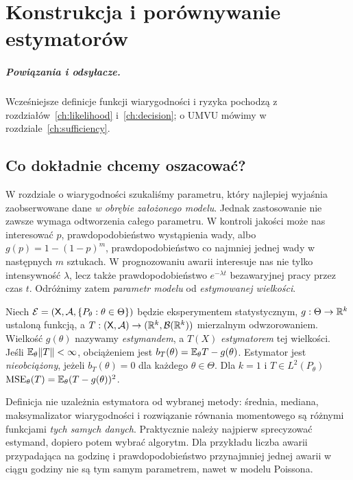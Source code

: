\chapter{Konstrukcja i porównywanie estymatorów}
\label{ch:estimators}
\paragraph{Powiązania i odsyłacze.} Wcześniejsze definicje funkcji wiarygodności i ryzyka pochodzą z rozdziałów~\ref{ch:likelihood} i~\ref{ch:decision}; o UMVU mówimy w rozdziale~\ref{ch:sufficiency}.


\section{Co dokładnie chcemy oszacować?}
W rozdziale o wiarygodności szukaliśmy parametru, który najlepiej
wyjaśnia zaobserwowane dane \emph{w obrębie założonego modelu}.
Jednak zastosowanie nie zawsze wymaga odtworzenia całego parametru.
W kontroli jakości może nas interesować $p$, prawdopodobieństwo
wystąpienia wady, albo $g(p)=1-(1-p)^m$, prawdopodobieństwo
co najmniej jednej wady w następnych $m$ sztukach. W prognozowaniu
awarii interesuje nas nie tylko intensywność $\lambda$, lecz także
prawdopodobieństwo $e^{-\lambda t}$ bezawaryjnej pracy przez czas $t$.
Odróżnimy zatem \emph{parametr modelu} od \emph{estymowanej wielkości}.

\begin{definicja}\label{def:estimand}
Niech $\mathcal E=(\mathsf X,\mathcal A,\{P_\theta:\theta\in\Theta\})$
będzie eksperymentem statystycznym, $g:\Theta\to\mathbb R^k$ ustaloną
funkcją, a $T:(\mathsf X,\mathcal A)\to(\mathbb R^k,\mathcal B(\mathbb R^k))$
mierzalnym odwzorowaniem. Wielkość $g(\theta)$ nazywamy
\emph{estymandem}, a $T(X)$ \emph{estymatorem} tej wielkości.
Jeśli $\mathbb E_\theta\|T\|<\infty$, obciążeniem jest
$b_T(\theta)=\mathbb E_\theta T-g(\theta)$. Estymator jest
\emph{nieobciążony}, jeżeli $b_T(\theta)=0$ dla każdego
$\theta\in\Theta$. Dla $k=1$ i $T\in L^2(P_\theta)$
$\operatorname{MSE}_\theta(T)=\mathbb E_\theta(T-g(\theta))^2$.
\end{definicja}

Definicja nie uzależnia estymatora od wybranej metody: średnia,
mediana, maksymalizator wiarygodności i rozwiązanie równania
momentowego są różnymi funkcjami \emph{tych samych danych}.
Praktycznie należy najpierw sprecyzować estymand, dopiero potem
wybrać algorytm. Dla przykładu liczba awarii przypadająca na godzinę
i prawdopodobieństwo przynajmniej jednej awarii w ciągu godziny
nie są tym samym parametrem, nawet w modelu Poissona.

